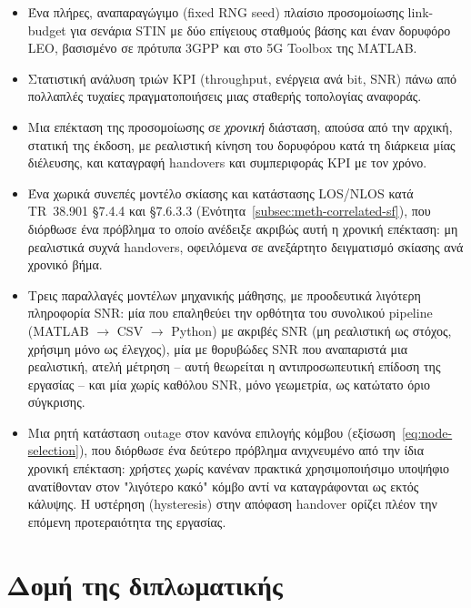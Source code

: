 \begin{itemize}
  \item Ένα πλήρες, αναπαραγώγιμο (fixed RNG seed) πλαίσιο προσομοίωσης
    link-budget για σενάρια STIN με δύο επίγειους σταθμούς βάσης και έναν
    δορυφόρο LEO, βασισμένο σε πρότυπα 3GPP και στο 5G Toolbox της
    MATLAB.
  \item Στατιστική ανάλυση τριών KPI (throughput, ενέργεια ανά bit, SNR)
    πάνω από πολλαπλές τυχαίες πραγματοποιήσεις μιας σταθερής τοπολογίας
    αναφοράς.
  \item Μια επέκταση της προσομοίωσης σε \emph{χρονική} διάσταση, απούσα
    από την αρχική, στατική της έκδοση, με ρεαλιστική κίνηση του
    δορυφόρου κατά τη διάρκεια μίας διέλευσης, και καταγραφή handovers
    και συμπεριφοράς KPI με τον χρόνο.
  \item Ένα χωρικά συνεπές μοντέλο σκίασης και κατάστασης LOS/NLOS κατά
    TR~38.901 §7.4.4 και §7.6.3.3
    (Ενότητα~\ref{subsec:meth-correlated-sf}), που διόρθωσε ένα πρόβλημα
    το οποίο ανέδειξε ακριβώς αυτή η χρονική επέκταση: μη ρεαλιστικά
    συχνά handovers, οφειλόμενα σε ανεξάρτητο δειγματισμό σκίασης ανά
    χρονικό βήμα.
  \item Τρεις παραλλαγές μοντέλων μηχανικής μάθησης, με προοδευτικά
    λιγότερη πληροφορία SNR: μία που επαληθεύει την ορθότητα του
    συνολικού pipeline (MATLAB $\rightarrow$ CSV $\rightarrow$ Python) με
    ακριβές SNR (μη ρεαλιστική ως στόχος, χρήσιμη μόνο ως έλεγχος), μία
    με θορυβώδες SNR που αναπαριστά μια ρεαλιστική, ατελή μέτρηση --
    αυτή θεωρείται η αντιπροσωπευτική επίδοση της εργασίας -- και μία
    χωρίς καθόλου SNR, μόνο γεωμετρία, ως κατώτατο όριο σύγκρισης.
  \item Μια ρητή κατάσταση outage στον κανόνα επιλογής κόμβου
    (εξίσωση~\eqref{eq:node-selection}), που διόρθωσε ένα δεύτερο
    πρόβλημα ανιχνευμένο από την ίδια χρονική επέκταση: χρήστες χωρίς
    κανέναν πρακτικά χρησιμοποιήσιμο υποψήφιο ανατίθονταν στον "λιγότερο
    κακό" κόμβο αντί να καταγράφονται ως εκτός κάλυψης. Η υστέρηση
    (hysteresis) στην απόφαση handover ορίζει πλέον την επόμενη
    προτεραιότητα της εργασίας.
\end{itemize}

\section{Δομή της διπλωματικής}
\label{sec:intro-structure}

